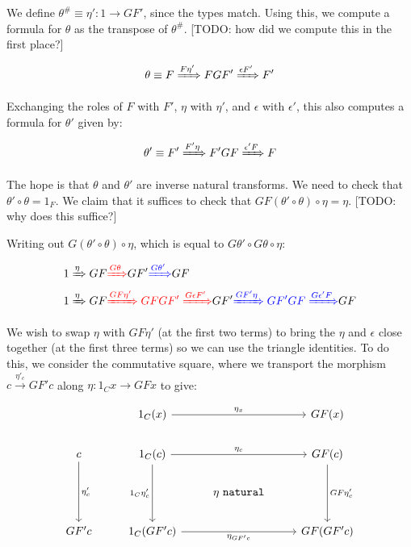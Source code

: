 \documentclass[14pt]{article}
\begin{document}
We define $\theta^\# \equiv \eta': 1 \to G F'$, since the types match. Using this, we compute a formula for $\theta$ as the
transpose of $\theta^\#$. [TODO: how did we compute this in the first place?]

$$
\theta \equiv F \xRightarrow{F \eta'} FGF' \xRightarrow{\epsilon F'} F'
$$

Exchanging the roles of $F$ with $F'$, $\eta$ with $\eta'$, and $\epsilon$ with $\epsilon'$,
this also computes a formula for $\theta'$ given by:

$$
\theta' \equiv F' \xRightarrow{F' \eta} F'GF \xRightarrow{\epsilon' F} F
$$

The hope is that $\theta$ and $\theta'$ are inverse natural transforms. We need to check that $\theta' \circ \theta = 1_F$. 
We claim that it suffices to check that $GF (\theta' \circ \theta) \circ \eta  = \eta$. [TODO: why does this suffice?]

Writing out $G (\theta' \circ \theta) \circ \eta$, which is equal to $G \theta' \circ G \theta \circ \eta$:

\begin{align*}
&1 \xRightarrow{\eta} GF {\color{red} \xRightarrow{G \theta}} GF' { \color{blue} \xRightarrow{G \theta'}} GF \\
&1 \xRightarrow{\eta} GF { \color{red} \xRightarrow{GF \eta'} GF GF' \xRightarrow{G \epsilon F'}} G F' 
{\color{blue} \xRightarrow{G F' \eta} G F' G F \xRightarrow{G \epsilon' F}} GF \\
\end{align*}

We wish to swap $\eta$ with $GF\eta'$ (at the first two terms)
to bring the $\eta$ and $\epsilon$ close together (at the first three terms) so we can use the triangle identities.
To do this, we consider the commutative square, where we transport the morphism $c \xrightarrow{\eta'_c} GF' c$
along $\eta: 1_Cx \to GFx$ to give:

\[\begin{tikzcd}
    & {1_C(x)} && {GF(x)} \\
    c & {1_C(c)} && {GF(c)} \\
    && {\eta~\texttt{natural}} \\
    {GF'c} & {1_C(GF'c)} && {GF(GF'c)}
    \arrow["{\eta'_c}", from=2-1, to=4-1]
    \arrow["{1_C\eta'_c}"', from=2-2, to=4-2]
    \arrow["{\eta_{c}}", from=2-2, to=2-4]
    \arrow["{\eta_{GF'c}}"', from=4-2, to=4-4]
    \arrow["{GF\eta'_c}", from=2-4, to=4-4]
    \arrow["{\eta_x}", from=1-2, to=1-4]
\end{tikzcd}\]
\end{document}
